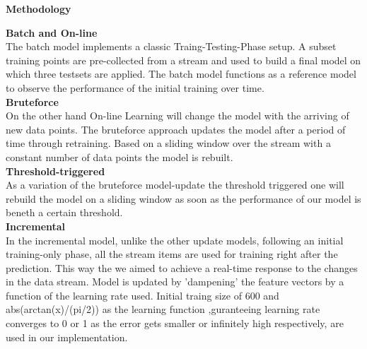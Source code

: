 \begin{center} \textbf{\huge Methodology} \end{center}
\textbf{\large Batch and On-line}\\
The batch model implements a classic Traing-Testing-Phase setup. A subset training points are pre-collected from a stream and used to build a final model on  which three testsets are applied. The batch model functions as a reference model to observe the performance of the initial training over time. \\
\textbf{\large Bruteforce}\\
On the other hand On-line Learning will change the model with the arriving of new data points.
The bruteforce approach updates the model after a period of time through retraining. Based on a sliding window over the stream with a constant number of data points 
the model is rebuilt.\\
\textbf{\large Threshold-triggered}\\
As a variation of the bruteforce model-update the threshold triggered one will rebuild the model on a sliding window as soon as the performance of our model is beneth a certain threshold. \\
\textbf{\large Incremental}\\
In the incremental model, unlike the other update models, following an initial training-only phase, all the stream items are used for training right after the prediction. This way the we aimed to achieve a real-time response to the changes in the data stream. Model is updated by 'dampening' the feature vectors by a function of the learning rate used. Initial traing size of 600 and abs(arctan(x)/(pi/2)) as the learning function ,guranteeing learning rate converges to 0 or 1 as the error gets smaller or infinitely high respectively, are used in our implementation. 
